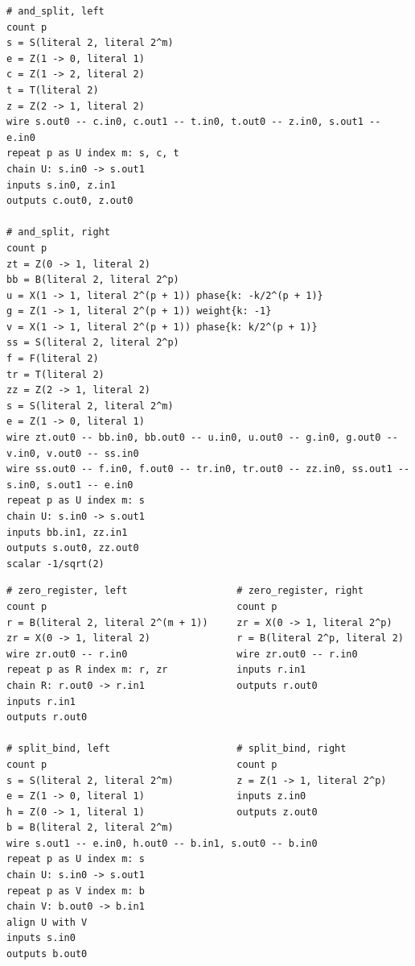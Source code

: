 \begin{lstlisting}[style=azx]
# and_split, left
count p
s = S(literal 2, literal 2^m)
e = Z(1 -> 0, literal 1)
c = Z(1 -> 2, literal 2)
t = T(literal 2)
z = Z(2 -> 1, literal 2)
wire s.out0 -- c.in0, c.out1 -- t.in0, t.out0 -- z.in0, s.out1 -- e.in0
repeat p as U index m: s, c, t
chain U: s.in0 -> s.out1
inputs s.in0, z.in1
outputs c.out0, z.out0

# and_split, right
count p
zt = Z(0 -> 1, literal 2)
bb = B(literal 2, literal 2^p)
u = X(1 -> 1, literal 2^(p + 1)) phase{k: -k/2^(p + 1)}
g = Z(1 -> 1, literal 2^(p + 1)) weight{k: -1}
v = X(1 -> 1, literal 2^(p + 1)) phase{k: k/2^(p + 1)}
ss = S(literal 2, literal 2^p)
f = F(literal 2)
tr = T(literal 2)
zz = Z(2 -> 1, literal 2)
s = S(literal 2, literal 2^m)
e = Z(1 -> 0, literal 1)
wire zt.out0 -- bb.in0, bb.out0 -- u.in0, u.out0 -- g.in0, g.out0 -- v.in0, v.out0 -- ss.in0
wire ss.out0 -- f.in0, f.out0 -- tr.in0, tr.out0 -- zz.in0, ss.out1 -- s.in0, s.out1 -- e.in0
repeat p as U index m: s
chain U: s.in0 -> s.out1
inputs bb.in1, zz.in1
outputs s.out0, zz.out0
scalar -1/sqrt(2)
\end{lstlisting}
\begin{lstlisting}[style=azx]
# zero_register, left                   # zero_register, right
count p                                 count p
r = B(literal 2, literal 2^(m + 1))     zr = X(0 -> 1, literal 2^p)
zr = X(0 -> 1, literal 2)               r = B(literal 2^p, literal 2)
wire zr.out0 -- r.in0                   wire zr.out0 -- r.in0
repeat p as R index m: r, zr            inputs r.in1
chain R: r.out0 -> r.in1                outputs r.out0
inputs r.in1
outputs r.out0

# split_bind, left                      # split_bind, right
count p                                 count p
s = S(literal 2, literal 2^m)           z = Z(1 -> 1, literal 2^p)
e = Z(1 -> 0, literal 1)                inputs z.in0
h = Z(0 -> 1, literal 1)                outputs z.out0
b = B(literal 2, literal 2^m)
wire s.out1 -- e.in0, h.out0 -- b.in1, s.out0 -- b.in0
repeat p as U index m: s
chain U: s.in0 -> s.out1
repeat p as V index m: b
chain V: b.out0 -> b.in1
align U with V
inputs s.in0
outputs b.out0
\end{lstlisting}
